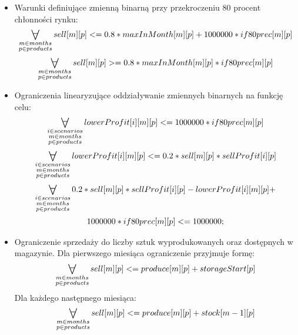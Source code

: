 \documentclass[11pt,a4paper]{article}
\newcommand\bigforall{%
  \mathop{\lower0.75ex\hbox{\ensuremath{%
    \mathlarger{\mathlarger{\mathlarger{\mathlarger{\forall}}}}}}}%
  \limits}
\begin{document}
\begin{itemize}
    \item Warunki definiujące zmienną binarną przy przekroczeniu 80 procent chłonności rynku:
	\begin{equation}
		\bigforall_{\substack{
			m \in months\\ 
			p \in products}}  sell[m][p] <= 0.8*maxInMonth[m][p] + 1000000 * if80prec[m][p]
	\end{equation}
	\begin{equation}
		\bigforall_{\substack{
			m \in months\\ 
			p \in products}} sell[m][p] >= 0.8*maxInMonth[m][p] * if80prec[m][p]
	\end{equation}
	
    \item Ograniczenia linearyzujące oddziaływanie zmiennych binarnych na funkcję celu:
	\begin{equation}
		\bigforall_{\substack{
			i \in scenarios\\			
			m \in months\\ 
			p \in products}} lowerProfit[i][m][p] <= 1000000 * if80prec[m][p]
	\end{equation}
	\begin{equation}
		\bigforall_{\substack{
			i \in scenarios\\			
			m \in months\\ 
			p \in products}} lowerProfit[i][m][p] <= 0.2 * sell[m][p]*sellProfit[i][p]
	\end{equation}
	\begin{multline}
		\bigforall_{\substack{
			i \in scenarios\\			
			m \in months\\ 
			p \in products}} 0.2 * sell[m][p]*sellProfit[i][p] - lowerProfit[i][m][p] +\\ 1000000 * if80prec[m][p] <= 1000000;
	\end{multline}
	
    \item Ograniczenie sprzedaży do liczby sztuk wyprodukowanych oraz dostępnych w magazynie. Dla pierwszego miesiąca ograniczenie przyjmuje formę:
	\begin{equation}
		\bigforall_{\substack{
			m \in months\\ 
			p \in products}} sell[m][p] <= produce[m][p]+storageStart[p]
	\end{equation}
	Dla każdego następnego miesiąca:
	\begin{equation}
		\bigforall_{\substack{
			m \in months\\ 
			p \in products}} sell[m][p] <= produce[m][p] + stock[m-1][p]
	\end{equation}
	

\end{itemize}
\end{document}
